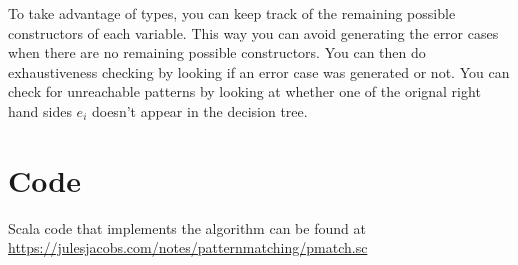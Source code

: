 \documentclass[a4paper, 11pt]{article}
\theoremstyle{definition}
\begin{document}
To take advantage of types, you can keep track of the remaining possible constructors of each variable. This way you can avoid generating the error cases when there are no remaining possible constructors. You can then do exhaustiveness checking by looking if an error case was generated or not. You can check for unreachable patterns by looking at whether one of the orignal right hand sides $e_i$ doesn't appear in the decision tree.

\section{Code}

Scala code that implements the algorithm can be found at \\ \url{https://julesjacobs.com/notes/patternmatching/pmatch.sc}

\nocite{*}


\end{document}
